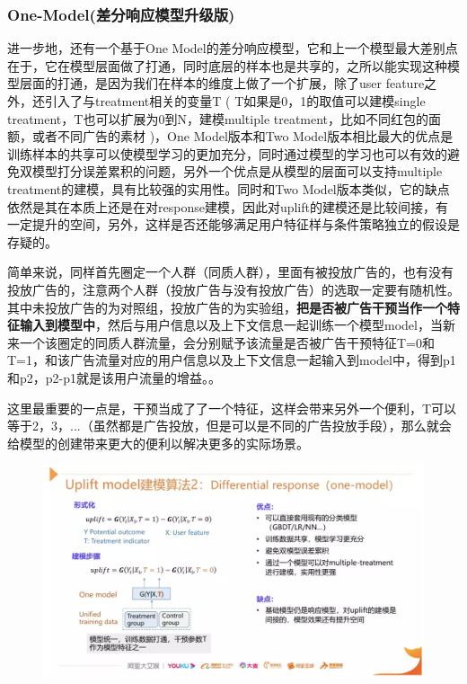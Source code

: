 \documentclass[12pt]{article}
\begin{document}
\subsubsection{One-Model(差分响应模型升级版)}
进一步地，还有一个基于One Model的差分响应模型，它和上一个模型最大差别点在于，它在模型层面做了打通，同时底层的样本也是共享的，之所以能实现这种模型层面的打通，是因为我们在样本的维度上做了一个扩展，除了user feature之外，还引入了与treatment相关的变量T ( T如果是0，1的取值可以建模single treatment，T也可以扩展为0到N，建模multiple treatment，比如不同红包的面额，或者不同广告的素材 )，One Model版本和Two Model版本相比最大的优点是训练样本的共享可以使模型学习的更加充分，同时通过模型的学习也可以有效的避免双模型打分误差累积的问题，另外一个优点是从模型的层面可以支持multiple treatment的建模，具有比较强的实用性。同时和Two Model版本类似，它的缺点依然是其在本质上还是在对response建模，因此对uplift的建模还是比较间接，有一定提升的空间，另外，这样是否还能够满足用户特征样与条件策略独立的假设是存疑的。

简单来说，同样首先圈定一个人群（同质人群），里面有被投放广告的，也有没有投放广告的，注意两个人群（投放广告与没有投放广告）的选取一定要有随机性。其中未投放广告的为对照组，投放广告的为实验组，\textbf{把是否被广告干预当作一个特征输入到模型中}，然后与用户信息以及上下文信息一起训练一个模型model，当新来一个该圈定的同质人群流量，会分别赋予该流量是否被广告干预特征T=0和T=1，和该广告流量对应的用户信息以及上下文信息一起输入到model中，得到p1和p2，p2-p1就是该用户流量的增益。\cite{Understand_Uplift_Model_In_Ads}。

这里最重要的一点是，干预当成了了一个特征，这样会带来另外一个便利，T可以等于2，3，...（虽然都是广告投放，但是可以是不同的广告投放手段），那么就会给模型的创建带来更大的便利以解决更多的实际场景。

\begin{figure}[H]
    \centering
    \includegraphics[width=1\textwidth]{fig/CasualInference-Uplift-Model-One-Model.png}
\end{figure}
\end{document}
